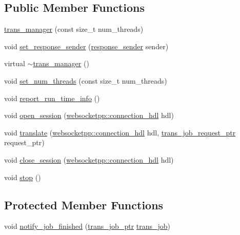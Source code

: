 \subsection*{Public Member Functions}
\begin{DoxyCompactItemize}
\item 
\hyperlink{classuva_1_1smt_1_1bpbd_1_1server_1_1trans__manager_a053a8f5be8b004358e5e20b3a1810efb}{trans\+\_\+manager} (const size\+\_\+t num\+\_\+threads)
\item 
void \hyperlink{classuva_1_1smt_1_1bpbd_1_1server_1_1trans__manager_a03bbff4118af58730ae43c9088203e00}{set\+\_\+response\+\_\+sender} (\hyperlink{classuva_1_1smt_1_1bpbd_1_1server_1_1trans__manager_ac7a3a0d2d4e7d21b2ce55161bf84f53e}{response\+\_\+sender} sender)
\item 
virtual \hyperlink{classuva_1_1smt_1_1bpbd_1_1server_1_1trans__manager_aa63b92c7bc0fdc41b879d02f16563506}{$\sim$trans\+\_\+manager} ()
\item 
void \hyperlink{classuva_1_1smt_1_1bpbd_1_1server_1_1trans__manager_a27073dba1257cacb734cc1063f2ee647}{set\+\_\+num\+\_\+threads} (const size\+\_\+t num\+\_\+threads)
\item 
void \hyperlink{classuva_1_1smt_1_1bpbd_1_1server_1_1trans__manager_ab943355ee7859a85c9d0e0cc6fd57206}{report\+\_\+run\+\_\+time\+\_\+info} ()
\item 
void \hyperlink{classuva_1_1smt_1_1bpbd_1_1server_1_1trans__manager_ac1d444c0788fe1ebbd2e771bff2dd5b9}{open\+\_\+session} (\hyperlink{namespacewebsocketpp_a6b3d26a10ee7229b84b776786332631d}{websocketpp\+::connection\+\_\+hdl} hdl)
\item 
void \hyperlink{classuva_1_1smt_1_1bpbd_1_1server_1_1trans__manager_adfc5b34f1b6e6211f3c87626ccc2cfa0}{translate} (\hyperlink{namespacewebsocketpp_a6b3d26a10ee7229b84b776786332631d}{websocketpp\+::connection\+\_\+hdl} hdl, \hyperlink{namespaceuva_1_1smt_1_1bpbd_1_1common_1_1messaging_af373ab262c0cab837c6ebe5e2eb62ea2}{trans\+\_\+job\+\_\+request\+\_\+ptr} request\+\_\+ptr)
\item 
void \hyperlink{classuva_1_1smt_1_1bpbd_1_1server_1_1trans__manager_a52ec4ea1281d987909f26d9775d7a543}{close\+\_\+session} (\hyperlink{namespacewebsocketpp_a6b3d26a10ee7229b84b776786332631d}{websocketpp\+::connection\+\_\+hdl} hdl)
\item 
void \hyperlink{classuva_1_1smt_1_1bpbd_1_1server_1_1trans__manager_a8c538e77c532642d4ecd2cd2655f5db7}{stop} ()
\end{DoxyCompactItemize}
\subsection*{Protected Member Functions}
\begin{DoxyCompactItemize}
\item 
void \hyperlink{classuva_1_1smt_1_1bpbd_1_1server_1_1trans__manager_a027b8ceba8cf5ac3f21c5963033d4653}{notify\+\_\+job\+\_\+finished} (\hyperlink{namespaceuva_1_1smt_1_1bpbd_1_1server_acb76132c82e66b5dbf7e3aa0e5af2580}{trans\+\_\+job\+\_\+ptr} \hyperlink{classuva_1_1smt_1_1bpbd_1_1server_1_1trans__job}{trans\+\_\+job})
\end{DoxyCompactItemize}


